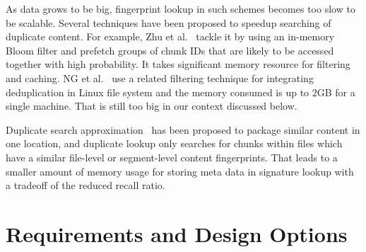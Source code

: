 As data grows to be big, fingerprint lookup in such schemes
becomes too slow to be scalable.
Several techniques have been proposed to speedup searching of duplicate 
content. For example,  
Zhu et al.~\cite{bottleneck08} tackle it 
by using an in-memory Bloom filter and prefetch groups of chunk IDs that are likely to be 
accessed together with high probability. It takes significant memory resource for filtering and caching.
NG et al.~\cite{ NGmiddleware2011}  use  
a related filtering technique for integrating deduplication in Linux  file system and the memory
consumed is up to 2GB for a single machine. That is still too big in our context discussed below. 

Duplicate  search approximation~\cite{extreme_binning09,sparseindex09}  has been proposed 
to package similar content in one location, and duplicate lookup  only searches
for chunks within files which have a similar file-level or segment-level  content fingerprints.
That leads  to a smaller amount of memory usage for storing meta data in signature
lookup with a tradeoff of the reduced recall ratio. 

\section{Requirements and Design Options}
\label{sect:options}

